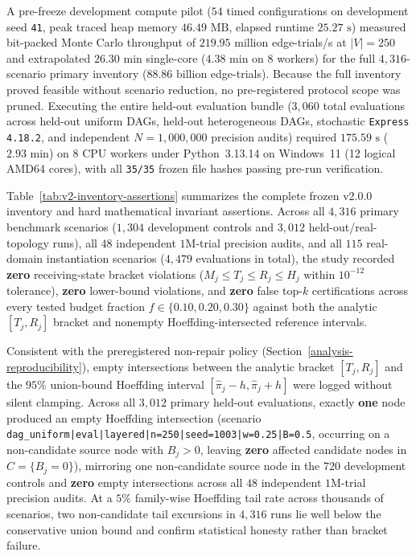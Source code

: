 A pre-freeze development compute pilot ($54$ timed configurations on
development seed \texttt{41}, peak traced heap memory $46.49\text{ MB}$,
elapsed runtime $25.27\text{ s}$) measured bit-packed Monte Carlo
throughput of $219.95\text{ million}$ edge-trials/s at $|V|=250$ and
extrapolated $26.30\text{ min}$ single-core ($4.38\text{ min}$ on
$8$ workers) for the full $4,316$-scenario primary inventory
($88.86\text{ billion}$ edge-trials). Because the full inventory proved
feasible without scenario reduction, no pre-registered protocol scope
was pruned. Executing the entire held-out evaluation bundle
($3,060$ total evaluations across held-out uniform DAGs, held-out
heterogeneous DAGs, stochastic \texttt{Express 4.18.2}, and independent
$N=1{,}000{,}000$ precision audits) required $175.59\text{ s}$
($2.93\text{ min}$) on $8$ CPU workers under Python~3.13.14 on
Windows~11 (12 logical AMD64 cores), with all \texttt{35/35} frozen
file hashes passing pre-run verification.



Table~\ref{tab:v2-inventory-assertions} summarizes the complete frozen
v2.0.0 inventory and hard mathematical invariant assertions. Across all
$4,316$ primary benchmark scenarios ($1,304$ development controls and
$3,012$ held-out/real-topology runs), all $48$ independent $1\text{M}$-trial
precision audits, and all $115$ real-domain instantiation scenarios
($4,479$ evaluations in total), the study recorded \textbf{zero}
receiving-state bracket violations ($M_j \le T_j \le R_j \le H_j$
within $10^{-12}$ tolerance), \textbf{zero} \citet{abbe2020} lower-bound
violations, and \textbf{zero} false top-$k$ certifications across every
tested budget fraction $f \in \{0.10, 0.20, 0.30\}$ against both the
analytic $[T_j, R_j]$ bracket and nonempty Hoeffding-intersected
reference intervals.

Consistent with the preregistered non-repair policy
(Section~\ref{analysis-reproducibility}), empty intersections between
the analytic bracket $[T_j, R_j]$ and the $95\%$ union-bound Hoeffding
interval $[\hat{\pi}_j - h, \hat{\pi}_j + h]$ were logged without
silent clamping. Across all $3,012$ primary held-out evaluations,
exactly \textbf{one} node produced an empty Hoeffding intersection
(scenario \texttt{dag\_\allowbreak uniform|\allowbreak eval|\allowbreak layered|\allowbreak n=250|\allowbreak seed=1003|\allowbreak w=0.25|\allowbreak B=0.5},
occurring on a non-candidate source node with $B_j > 0$, leaving
\textbf{zero} affected candidate nodes in $C=\{B_j=0\}$), mirroring
one non-candidate source node in the $720$ development controls and
\textbf{zero} empty intersections across all $48$ independent
$1\text{M}$-trial precision audits. At a $5\%$ family-wise Hoeffding
tail rate across thousands of scenarios, two non-candidate tail
excursions in $4,316$ runs lie well below the conservative union bound
and confirm statistical honesty rather than bracket failure.

